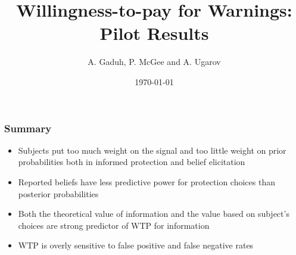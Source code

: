 \documentclass[11pt,hyperref={bookmarks=false}]{beamer}
\title[Willingness-to-pay for Warnings]{Willingness-to-pay for Warnings: Pilot Results}
\author[A. Gaduh, P. McGee and A. Ugarov]{A. Gaduh, P. McGee and A. Ugarov}
\institute[]{}
\date{\today}
\newcommand\BackgroundPic{%
\put(0,0){%
\parbox[b][\paperheight]{\paperwidth}{%
\vfill
\centering
\vfill
}}}
\begin{document}

\begin{frame}
\titlepage
\end{frame}


\begin{frame}
\frametitle{Summary}
\begin{itemize}
\item Subjects put too much weight on the signal and too little weight on prior probabilities both in informed protection and belief elicitation
\item Reported beliefs have less predictive power for protection choices than posterior probabilities
\item Both the theoretical value of information and the value based on subject's choices are strong predictor of WTP for information
\item WTP is overly sensitive to false positive and false negative rates
\end{itemize}
\end{frame}


\iffalse
\end{document}
